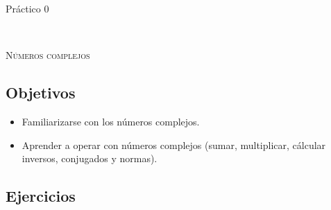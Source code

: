 \documentclass[12pt]{amsart}
\begin{document}



\centerline{\Large{Pr\' actico 0}}

\

\centerline{\textsc{N\'{u}meros complejos}}


\bigbreak

\subsection*{Objetivos}

\begin{itemize}
 \item Familiarizarse con los n\'umeros complejos.
 \item Aprender a operar con n\'umeros complejos (sumar, multiplicar, c\'alcular inversos, conjugados y normas).
\end{itemize}

\subsection*{Ejercicios}
\end{document}
